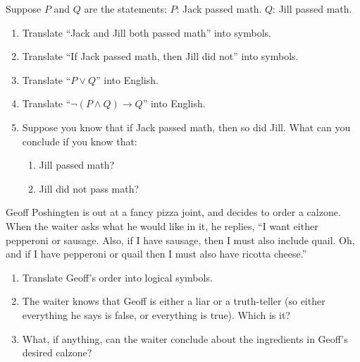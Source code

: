 \documentclass[11pt,]{book}
\theoremstyle{ptxplainnotitle}
\theoremstyle{ptxplaintitle}
\theoremstyle{ptxdefinitionnotitle}
\theoremstyle{ptxdefinitiontitle}
\theoremstyle{ptxdefinitionnotitle}
\theoremstyle{ptxdefinitiontitle}
\theoremstyle{ptxdefinitionnotitle}
\theoremstyle{ptxdefinitiontitle}
\theoremstyle{ptxdefinitiontitlenonumber}
\theoremstyle{ptxdefinitiontitlenonumber}
\numberwithin{equation}{chapter}
\newcommand{\imp}{\rightarrow}
\begin{document}
\begin{divisionexercise}{12}\hypertarget{exercise-160}{}
\hypertarget{p-2157}{}%
Suppose \(P\) and \(Q\) are the statements: \(P\): Jack passed math. \(Q\): Jill passed math. \leavevmode%
\begin{enumerate}[label=(\alph*)]
\item\hypertarget{li-1100}{}\hypertarget{p-2158}{}%
Translate ``Jack and Jill both passed math'' into symbols.%
\item\hypertarget{li-1101}{}\hypertarget{p-2159}{}%
Translate ``If Jack passed math, then Jill did not'' into symbols.%
\item\hypertarget{li-1102}{}\hypertarget{p-2160}{}%
Translate ``\(P \vee Q\)'' into English.%
\item\hypertarget{li-1103}{}\hypertarget{p-2161}{}%
Translate ``\(\neg(P \wedge Q) \imp Q\)'' into English.%
\item\hypertarget{li-1104}{}\hypertarget{p-2162}{}%
Suppose you know that if Jack passed math, then so did Jill.  What can you conclude if you know that: %
\begin{enumerate}[label=\roman*.]
\item\hypertarget{li-1105}{}Jill passed math?%
\item\hypertarget{li-1106}{}Jill did not pass math?%
\end{enumerate}
%
\end{enumerate}
%
\end{divisionexercise}%
\begin{divisionexercise}{13}\hypertarget{exercise-161}{}
\hypertarget{p-2167}{}%
Geoff Poshingten is out at a fancy pizza joint, and decides to order a calzone. When the waiter asks what he would like in it, he replies, ``I want either pepperoni or sausage. Also, if I have sausage, then I must also include quail. Oh, and if I have pepperoni or quail then I must also have ricotta cheese.'' \leavevmode%
\begin{enumerate}[label=(\alph*)]
\item\hypertarget{li-1114}{}\hypertarget{p-2168}{}%
Translate Geoff's order into logical symbols.%
\item\hypertarget{li-1115}{}\hypertarget{p-2169}{}%
The waiter knows that Geoff is either a liar or a truth-teller (so either everything he says is false, or everything is true).  Which is it?%
\item\hypertarget{li-1116}{}\hypertarget{p-2170}{}%
What, if anything, can the waiter conclude about the ingredients in Geoff's desired calzone?%
\end{enumerate}
%
\end{divisionexercise}%
\end{document}
